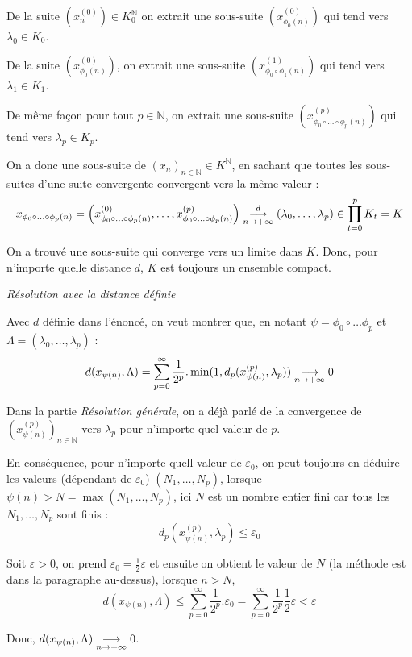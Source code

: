 \documentclass{article}
\begin{document}
De la suite $\left( x_n^{(0)} \right) \in K_0^\mathbb{N}$ on extrait une sous-suite $\left( x_{\phi_0(n)}^{(0)} \right)$ qui tend vers $\lambda_0 \in K_0$.

De la suite $(x_{\phi_0(n)}^{(0)})$, on extrait une sous-suite $\left( x_{\phi_0 \circ\phi_1(n)}^{(1)} \right)$ qui tend vers $\lambda_1 \in K_1$.

De même façon pour tout $p \in \mathbb{N}$, on extrait une sous-suite $\left( x_{\phi_0 \circ \ldots \circ \phi_p(n)}^{(p)} \right)$ qui tend vers $\lambda_p \in K_p$.

On a donc une sous-suite de $(x_n)_{n \in \mathbb{N} }\in K^\mathbb{N}$, en sachant que toutes les sous-suites d'une suite convergente convergent vers la même valeur : 
\[
    x_{\phi_0 \circ \ldots \circ \phi_p(n)} = \left( x_{\phi_0 \circ \ldots \circ \phi_p(n)}^{(0)} , \ldots, x_{\phi_0 \circ \ldots \circ \phi_p(n)}^{(p)}\right) \underset{n \rightarrow +\infty} {\buildrel d \over \longrightarrow}\left( \lambda_0 , \ldots, \lambda_p\right) \in \prod_{t=0}^p K_t = K
\]

On a trouvé une sous-suite qui converge vers un limite dans $K$. Donc, pour n'importe quelle distance $d$, $K$ est toujours un ensemble compact.

\noindent \textit{Résolution avec la distance définie}

Avec $d$ définie dans l'énoncé, on veut montrer que, en notant $\psi = \phi_0 \circ \ldots \phi_p$ et $\Lambda = (\lambda_0, \ldots, \lambda_p)$ :
\[
    d(x_{\psi(n)}, \Lambda) = \sum_{p=0}^{\infty} \frac{1}{2^p} . \min(1, d_p(x_{\psi(n)}^{(p)}, \lambda_p))\underset{n \rightarrow +\infty} {\buildrel  \over \longrightarrow} 0
\]

Dans la partie \textit{Résolution générale}, on a déjà parlé de la convergence de $(x_{\psi(n)}^{(p)})_{n \in \mathbb{N}}$ vers $\lambda_p$ pour n'importe quel valeur de  $p$.

En conséquence, pour n'importe quell valeur de $\varepsilon_0$, on peut toujours en déduire les valeurs (dépendant de $\varepsilon_0$) $(N_1, \ldots, N_p)$, lorsque $\psi(n) > N = \max(N_1, \ldots, N_p)$, ici $N$ est un nombre entier fini car tous les  $N_1, \ldots, N_p$ sont finis :
\[
    d_p(x_{\psi(n)}^{(p)}, \lambda_p) \leq \varepsilon_0
\]

Soit $\varepsilon >0$, on prend $\varepsilon_0 = \frac{1}{2} \varepsilon$ et ensuite on obtient le valeur de  $N$ (la méthode est dans la paragraphe au-dessus), lorsque $n> N$, 
\[
d(x_{\psi(n)}, \Lambda) \leq \sum_{p=0}^{\infty} \frac{1}{2^p} . \varepsilon_0 = \sum_{p=0}^{\infty} \frac{1}{2^p} \frac{1}{2} \varepsilon < \varepsilon
\]

Donc, $d(x_{\psi(n)}, \Lambda) \underset{n \rightarrow +\infty} {\buildrel  \over \longrightarrow} 0$.

\end{document}
